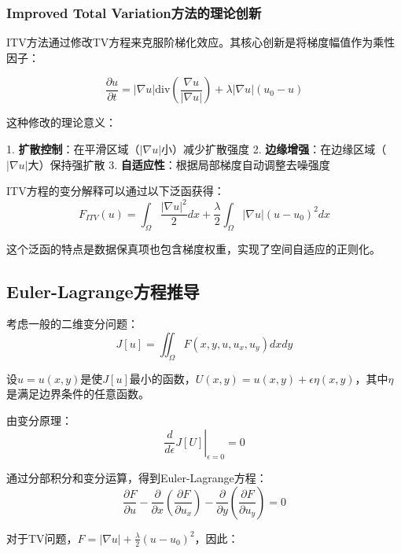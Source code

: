\documentclass[a4paper,12pt]{ctexart}
\begin{document}
\subsubsection{Improved Total Variation方法的理论创新}

ITV方法通过修改TV方程来克服阶梯化效应。其核心创新是将梯度幅值作为乘性因子：

\begin{equation}
\frac{\partial u}{\partial t} = |\nabla u| \text{div}\left(\frac{\nabla u}{|\nabla u|}\right) + \lambda |\nabla u|(u_0 - u)
\end{equation}

这种修改的理论意义：

1. \textbf{扩散控制}：在平滑区域（$|\nabla u|$小）减少扩散强度
2. \textbf{边缘增强}：在边缘区域（$|\nabla u|$大）保持强扩散
3. \textbf{自适应性}：根据局部梯度自动调整去噪强度

ITV方程的变分解释可以通过以下泛函获得：
\begin{equation}
F_{ITV}(u) = \int_{\Omega} \frac{|\nabla u|^2}{2} dx + \frac{\lambda}{2} \int_{\Omega} |\nabla u| (u - u_0)^2 dx
\end{equation}

这个泛函的特点是数据保真项也包含梯度权重，实现了空间自适应的正则化。

\subsection{Euler-Lagrange方程推导}

考虑一般的二维变分问题：
\begin{equation}
J[u] = \iint_{\Omega} F(x,y,u,u_x,u_y) dx dy
\end{equation}

设$u = u(x,y)$是使$J[u]$最小的函数，$U(x,y) = u(x,y) + \epsilon \eta(x,y)$，其中$\eta$是满足边界条件的任意函数。

由变分原理：
\begin{equation}
\left.\frac{d}{d\epsilon} J[U]\right|_{\epsilon=0} = 0
\end{equation}

通过分部积分和变分运算，得到Euler-Lagrange方程：
\begin{equation}
\frac{\partial F}{\partial u} - \frac{\partial}{\partial x}\left(\frac{\partial F}{\partial u_x}\right) - \frac{\partial}{\partial y}\left(\frac{\partial F}{\partial u_y}\right) = 0
\end{equation}

对于TV问题，$F = |\nabla u| + \frac{\lambda}{2}(u-u_0)^2$，因此：
\end{document}
